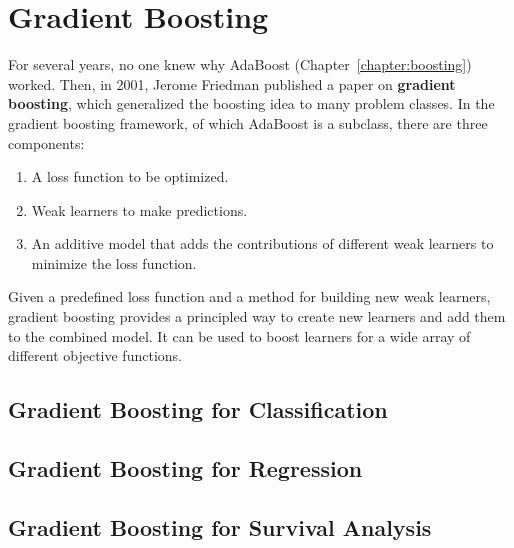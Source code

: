 \chapter{Gradient Boosting \label{chapter:gradientboosting}}

For several years, no one knew why AdaBoost (Chapter~\ref{chapter:boosting}) worked. Then, in 2001, Jerome Friedman published a paper on \textbf{gradient boosting}, which generalized the boosting idea to many problem classes. In the gradient boosting framework, of which AdaBoost is a subclass, there are three components:

\begin{enumerate}
\item A loss function to be optimized.
\item Weak learners to make predictions.
\item An additive model that adds the contributions of different weak learners to minimize the loss function.
\end{enumerate}

Given a predefined loss function and a method for building new weak learners, gradient boosting provides a principled way to create new learners and add them to the combined model. It can be used to boost learners for a wide array of different objective functions. 


\section{Gradient Boosting for Classification}


\section{Gradient Boosting for Regression}


\section{Gradient Boosting for Survival Analysis}